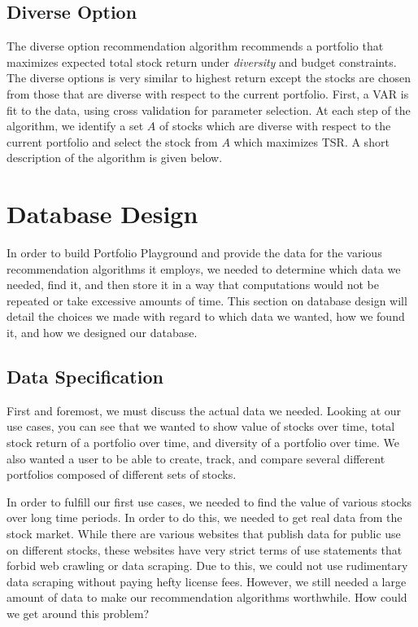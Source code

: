 \documentclass{article}
\begin{document}
\subsection{Diverse Option}
The diverse option recommendation algorithm recommends a portfolio that maximizes expected total stock return under \emph{diversity} and budget constraints. The diverse options is very similar to highest return except the stocks are chosen from those that are diverse with respect to the current portfolio. First, a VAR is fit to the data, using cross validation for parameter selection. At each step of the algorithm, we identify a set $A$ of stocks which are diverse with respect to the current portfolio and select the stock from $A$ which maximizes TSR. A short description of the algorithm is given below.

\section{Database Design}
In order to build Portfolio Playground and provide the data for the various recommendation algorithms it employs, we needed to determine which data we needed, find it, and then store it in a way that computations would not be repeated or take excessive amounts of time.  This section on database design will detail the choices we made with regard to which data we wanted, how we found it, and how we designed our database.

\subsection{Data Specification}
First and foremost, we must discuss the actual data we needed.  Looking at our use cases, you can see that we wanted to show value of stocks over time, total stock return of a portfolio over time, and diversity of a portfolio over time.  We also wanted a user to be able to create, track, and compare several different portfolios composed of different sets of stocks.  

In order to fulfill our first use cases, we needed to find the value of various stocks over long time periods.  In order to do this, we needed to get real data from the stock market.  While there are various websites that publish data for public use on different stocks, these websites have very strict terms of use statements that forbid web crawling or data scraping.  Due to this, we could not use rudimentary data scraping without paying hefty license fees.  However, we still needed a large amount of data to make our recommendation algorithms worthwhile.  How could we get around this problem?
\end{document}
